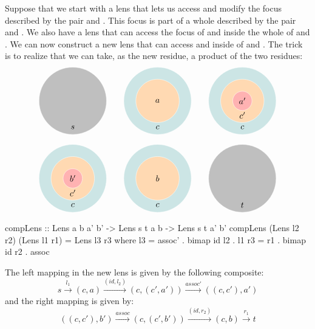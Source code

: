 \documentclass[DaoFP]{subfiles}
\begin{document}
Suppose that we start with a lens that lets us access and modify the focus described by the pair  and . This focus is part of a whole described by the pair  and . We also have a lens that can access the focus of  and  inside the whole of  and . We can now construct a new lens that can access  and  inside of  and . The trick is to realize that we can take, as the new residue, a product of the two residues:
\[
\begin{tikzpicture}
\filldraw[fill=gray!50, draw=white] (0, 0) circle (1.4);
\node at (0, -1.1) {$s$};
\end{tikzpicture}
\hspace{20pt}
\begin{tikzpicture}
\filldraw[fill=blue!50!green!20, draw=white] (0, 0) circle (1.4);
\filldraw[fill=orange!30, draw=white] (0, 0) circle (0.9);
\node at (0, 0) {$a$};
\node at (0, -1.1) {$c$};
\end{tikzpicture}
\hspace{20pt}
\begin{tikzpicture}
\filldraw[fill=blue!50!green!20, draw=white] (0, 0) circle (1.4);
\filldraw[fill=orange!30, draw=white] (0, 0) circle (0.9);
\filldraw[fill=red!30, draw=white] (0, 0) circle (0.4);
\node at (0, 0) {$a'$};
\node at (0, -0.6) {$c'$};
\node at (0, -1.1) {$c$};
\end{tikzpicture}
\]

\[
\begin{tikzpicture}
\filldraw[fill=blue!50!green!20, draw=white] (0, 0) circle (1.4);
\filldraw[fill=orange!30, draw=white] (0, 0) circle (0.9);
\filldraw[fill=red!30, draw=white] (0, 0) circle (0.4);
\node at (0, 0) {$b'$};
\node at (0, -0.6) {$c'$};
\node at (0, -1.1) {$c$};
\end{tikzpicture}
\hspace{20pt}
\begin{tikzpicture}
\filldraw[fill=blue!50!green!20, draw=white] (0, 0) circle (1.4);
\filldraw[fill=orange!30, draw=white] (0, 0) circle (0.9);
\node at (0, 0) {$b$};
\node at (0, -1.1) {$c$};
\end{tikzpicture}
\hspace{20pt}
\begin{tikzpicture}
\filldraw[fill=gray!50, draw=white] (0, 0) circle (1.4);
\node at (0, -1.1) {$t$};
\end{tikzpicture}
\]



\begin{haskell}
compLens :: Lens a b a' b' -> Lens s t a b -> Lens s t a' b'
compLens (Lens l2 r2) (Lens l1 r1) = Lens l3 r3
  where l3 = assoc' . bimap id l2  . l1
        r3 = r1 . bimap id r2 . assoc
\end{haskell}
The left mapping in the new lens is given by the following composite:
\[ s \xrightarrow{l_1} (c, a)   \xrightarrow{(id, l_2)} (c, (c', a'))  \xrightarrow{assoc'} ((c, c'), a')\]
and the right mapping is given by:
\[ ((c, c'), b') \xrightarrow{assoc}  (c, (c', b')) \xrightarrow{(id, r_2)} (c, b) \xrightarrow{r_1} t \]
\end{document}
